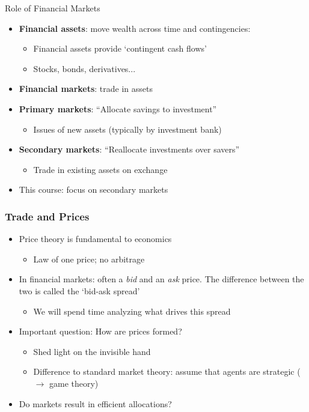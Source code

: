 \documentclass[english,10pt]{beamer}
\theoremstyle{definition}
\begin{document}
\begin{frame}{Role of Financial Markets}
\begin{itemize}
	\item \textbf{Financial assets}: move wealth across time and contingencies: 
	\begin{itemize}
		\item Financial assets provide `contingent cash flows'
		\item Stocks, bonds, derivatives...
	\end{itemize}
	\item \textbf{Financial markets}: trade in assets
	\item \textbf{Primary markets}: ``Allocate savings to investment''
	\begin{itemize}
		\item Issues of new assets (typically by investment bank)
	\end{itemize}
	\item \textbf{Secondary markets}: ``Reallocate investments over savers''
	\begin{itemize}
		\item Trade in existing assets on exchange
	\end{itemize}	
	\item This course: focus on secondary markets 
\end{itemize}
\end{frame}


\begin{frame}[label=main2]
\frametitle{Trade and Prices}
\begin{itemize}
	\item Price theory is fundamental to economics
	\begin{itemize}
		\item Law of one price; no arbitrage
	\end{itemize}
	\item In financial markets: often a \textit{bid} and an \textit{ask} price. The difference between the two is called the `bid-ask spread' \hyperlink{bidask}{}
	\begin{itemize}
		\item We will spend time analyzing what drives this spread
	\end{itemize}
	\item Important question: How are prices formed?
	\begin{itemize}
		\item Shed light on the invisible hand
		\item Difference to standard market theory: assume that agents are strategic ($\rightarrow$ game theory)  \hyperlink{strategy}{}
	\end{itemize}
	\item Do markets result in efficient allocations?
\end{itemize}
\end{frame}
\end{document}
